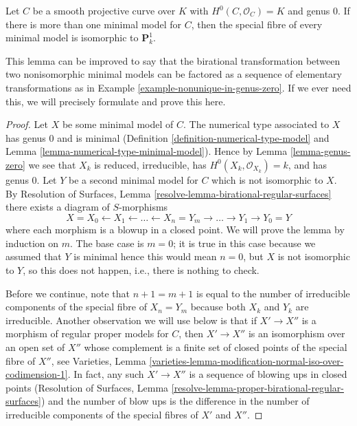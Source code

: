 \begin{lemma}
\label{lemma-nonuniqueness}
Let $C$ be a smooth projective curve over $K$ with $H^0(C, \mathcal{O}_C) = K$
and genus $0$. If there is more than one minimal model for $C$, then
the special fibre of every minimal model is isomorphic to $\mathbf{P}^1_k$.
\end{lemma}

\noindent
This lemma can be improved to say that the birational transformation
between two nonisomorphic minimal models can be factored as a sequence of
elementary transformations as in Example \ref{example-nonunique-in-genus-zero}.
If we ever need this, we will precisely formulate and prove this here.

\begin{proof}
Let $X$ be some minimal model of $C$. The numerical type associated to $X$
has genus $0$ and is minimal (Definition \ref{definition-numerical-type-model}
and Lemma \ref{lemma-numerical-type-minimal-model}).
Hence by Lemma \ref{lemma-genus-zero} we see that
$X_k$ is reduced, irreducible, has $H^0(X_k, \mathcal{O}_{X_k}) = k$,
and has genus $0$. Let $Y$ be a second minimal model for $C$
which is not isomorphic to $X$. By
Resolution of Surfaces, Lemma \ref{resolve-lemma-birational-regular-surfaces}
there exists a diagram of $S$-morphisms
$$
X = X_0 \leftarrow X_1 \leftarrow \ldots \leftarrow X_n = Y_m
\to \ldots \to Y_1 \to Y_0 = Y
$$
where each morphism is a blowup in a closed point. We will prove the
lemma by induction on $m$. The base case is $m = 0$; it is
true in this case because we assumed that $Y$ is minimal
hence this would mean $n = 0$, but $X$ is not isomorphic
to $Y$, so this does not happen, i.e., there is nothing to check.

\medskip\noindent
Before we continue, note that $n + 1 = m + 1$ is equal to the number of
irreducible components of the special fibre of $X_n = Y_m$ because
both $X_k$ and $Y_k$ are irreducible. Another observation we
will use below is that if $X' \to X''$ is a morphism
of regular proper models for $C$, then $X' \to X''$ is an isomorphism
over an open set of $X''$ whose complement is a finite set
of closed points of the special fibre of $X''$, see
Varieties, Lemma
\ref{varieties-lemma-modification-normal-iso-over-codimension-1}.
In fact, any such $X' \to X''$ is a sequence
of blowing ups in closed points (Resolution of Surfaces, Lemma
\ref{resolve-lemma-proper-birational-regular-surfaces}) and the
number of blow ups is the difference in the number of irreducible
components of the special fibres of $X'$ and $X''$.


\end{proof}
